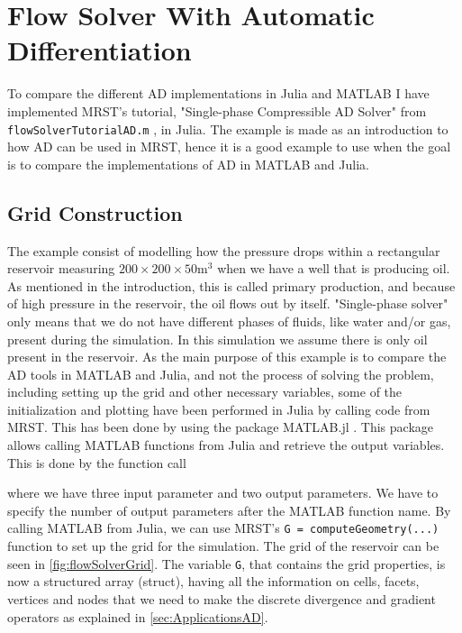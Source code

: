 \chapter{Flow Solver With Automatic Differentiation}
\label{ch:FlowSolver}
To compare the different AD implementations in Julia and MATLAB I have implemented MRST's tutorial, "Single-phase Compressible AD Solver" from \texttt{flowSolverTutorialAD.m} \emph{\citep{flowSolverADExample}}, in Julia. The example is made as an introduction to how AD can be used in MRST, hence it is a good example to use when the goal is to compare the implementations of AD in MATLAB and Julia. 

\section{Grid Construction}
\label{sec:GridConstruction}
The example consist of modelling how the pressure drops within a rectangular reservoir measuring $200\times 200 \times 50 \text{m}^3$ when we have a well that is producing oil. As mentioned in the introduction, this is called primary production, and because of high pressure in the reservoir, the oil flows out by itself. "Single-phase solver" only means that we do not have different phases of fluids, like water and/or gas, present during the simulation. In this simulation we assume there is only oil present in the reservoir. As the main purpose of this example is to compare the AD tools in MATLAB and Julia, and not the process of solving the problem, including setting up the grid and other necessary variables, some of the initialization and plotting have been performed in Julia by calling code from MRST. This has been done by using the package MATLAB.jl \emph{\citep{MATLAB.jl}}. This package allows calling MATLAB functions from Julia and retrieve the output variables. This is done by the function call

where we have three input parameter and two output parameters. We have to specify the number of output parameters after the MATLAB function name.  By calling MATLAB from Julia, we can use MRST's \texttt{G = computeGeometry(...)} function to set up the grid for the simulation. The grid of the reservoir can be seen in \autoref{fig:flowSolverGrid}. The variable \texttt{G}, that contains the grid properties, is now a structured array (struct), having all the information on cells, facets, vertices and nodes that we need to make the discrete divergence and gradient operators as explained in \autoref{sec:ApplicationsAD}. 

